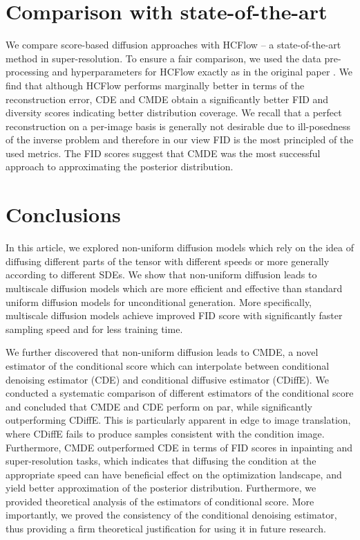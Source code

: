     

\section{Comparison with state-of-the-art}
We compare score-based diffusion approaches with HCFlow \cite{liang2021hrflow} -- a state-of-the-art method in super-resolution. To ensure a fair comparison, we used the data pre-processing and hyperparameters for HCFlow exactly as in the original paper \cite{liang2021hrflow}. We find that although HCFlow performs marginally better in terms of the reconstruction error, CDE and CMDE obtain a significantly better FID and diversity scores indicating better distribution coverage. 
We recall that a perfect reconstruction on a per-image basis is generally not desirable due to ill-posedness of the inverse problem and therefore in our view FID is the most principled of the used metrics.
The FID scores suggest that CMDE was the most successful approach to approximating the posterior distribution.




\section{Conclusions}

In this article, we explored non-uniform diffusion models which rely on the idea of diffusing different parts of the tensor with different speeds or more generally according to different SDEs. We show that non-uniform diffusion leads to multiscale diffusion models which are more efficient and effective than standard uniform diffusion models for unconditional generation. More specifically, multiscale diffusion models achieve improved FID score with significantly faster sampling speed and for less training time.

We further discovered that non-uniform diffusion leads to CMDE, a novel estimator of the conditional score which can interpolate between conditional denoising estimator (CDE) and conditional diffusive estimator (CDiffE). We conducted a systematic comparison of different estimators of the conditional score and concluded that CMDE and CDE perform on par, while significantly outperforming CDiffE. This is particularly apparent in edge to image translation, where CDiffE fails to produce samples consistent with the condition image. Furthermore, CMDE outperformed CDE in terms of FID scores in inpainting and super-resolution tasks, which indicates that diffusing the condition at the appropriate speed can have beneficial effect on the optimization landscape, and yield better approximation of the posterior distribution. Furthermore, we provided theoretical analysis of the estimators of conditional score. More importantly, we proved the consistency of the conditional denoising estimator, thus providing a firm theoretical justification for using it in future research. 
